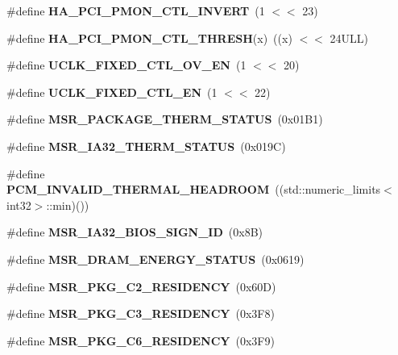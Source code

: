 \begin{DoxyCompactItemize}
\mbox{\label{types_8h_a02a9bf175d75b23654bae1be0d925013}} 
\#define {\bfseries H\+A\+\_\+\+P\+C\+I\+\_\+\+P\+M\+O\+N\+\_\+\+C\+T\+L\+\_\+\+I\+N\+V\+E\+RT}~(1 $<$$<$ 23)
\item 
\mbox{\label{types_8h_a0268380586bfeeefc62468e7b9c8aff4}} 
\#define {\bfseries H\+A\+\_\+\+P\+C\+I\+\_\+\+P\+M\+O\+N\+\_\+\+C\+T\+L\+\_\+\+T\+H\+R\+E\+SH}(x)~((x) $<$$<$ 24\+U\+L\+L)
\item 
\mbox{\label{types_8h_a73a6f75fef41747247b3b0745896441f}} 
\#define {\bfseries U\+C\+L\+K\+\_\+\+F\+I\+X\+E\+D\+\_\+\+C\+T\+L\+\_\+\+O\+V\+\_\+\+EN}~(1 $<$$<$ 20)
\item 
\mbox{\label{types_8h_ad92fa3f311956b75d7ac72004d59657d}} 
\#define {\bfseries U\+C\+L\+K\+\_\+\+F\+I\+X\+E\+D\+\_\+\+C\+T\+L\+\_\+\+EN}~(1 $<$$<$ 22)
\item 
\mbox{\label{types_8h_a4d40c003f2608f118c644465406aed3b}} 
\#define {\bfseries M\+S\+R\+\_\+\+P\+A\+C\+K\+A\+G\+E\+\_\+\+T\+H\+E\+R\+M\+\_\+\+S\+T\+A\+T\+US}~(0x01\+B1)
\item 
\mbox{\label{types_8h_a3940bd7e7cc81fd9476152b71e29ea7b}} 
\#define {\bfseries M\+S\+R\+\_\+\+I\+A32\+\_\+\+T\+H\+E\+R\+M\+\_\+\+S\+T\+A\+T\+US}~(0x019\+C)
\item 
\mbox{\label{types_8h_a2f51296747d63852b05ea0afab0b700e}} 
\#define {\bfseries P\+C\+M\+\_\+\+I\+N\+V\+A\+L\+I\+D\+\_\+\+T\+H\+E\+R\+M\+A\+L\+\_\+\+H\+E\+A\+D\+R\+O\+OM}~((std\+::numeric\+\_\+limits$<$int32$>$\+::min)())
\item 
\mbox{\label{types_8h_a7d438170685832bc8e8fbcda8383c0cc}} 
\#define {\bfseries M\+S\+R\+\_\+\+I\+A32\+\_\+\+B\+I\+O\+S\+\_\+\+S\+I\+G\+N\+\_\+\+ID}~(0x8\+B)
\item 
\mbox{\label{types_8h_a26933b2c6904d22e9964f3f12c730fc8}} 
\#define {\bfseries M\+S\+R\+\_\+\+D\+R\+A\+M\+\_\+\+E\+N\+E\+R\+G\+Y\+\_\+\+S\+T\+A\+T\+US}~(0x0619)
\item 
\mbox{\label{types_8h_a82b97c2b35585f2293a7aa66839f472a}} 
\#define {\bfseries M\+S\+R\+\_\+\+P\+K\+G\+\_\+\+C2\+\_\+\+R\+E\+S\+I\+D\+E\+N\+CY}~(0x60\+D)
\item 
\mbox{\label{types_8h_a6c046e593954087b70981b8169b470f9}} 
\#define {\bfseries M\+S\+R\+\_\+\+P\+K\+G\+\_\+\+C3\+\_\+\+R\+E\+S\+I\+D\+E\+N\+CY}~(0x3\+F8)
\item 
\mbox{\label{types_8h_a7b1860de9867ad4e3c29bd2e240686b4}} 
\#define {\bfseries M\+S\+R\+\_\+\+P\+K\+G\+\_\+\+C6\+\_\+\+R\+E\+S\+I\+D\+E\+N\+CY}~(0x3\+F9)
\item 
\mbox{\label{types_8h_ae5f3968ee1644c8e11ed55463378b5a1}} 

\end{DoxyCompactItemize}
